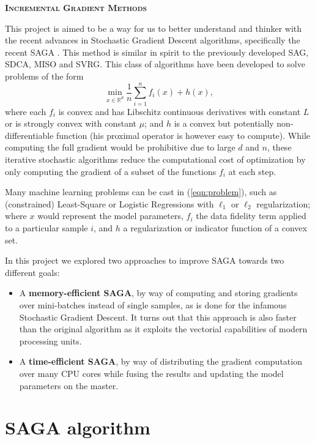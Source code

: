\documentclass[a4paper,11pt]{article}
\newcommand{\R}{\mathbb{R}}
\newcommand{\eqnref}[1]{(\ref{eqn:#1})}
\begin{document}
\begin{center}
	\Large{\textbf{\textsc{Incremental Gradient Methods}}}
\end{center}

This project is aimed to be a way for us to better understand and thinker with
the recent advances in Stochastic Gradient Descent algorithms, specifically
the recent SAGA \cite{defazio_saga_2014}. This method is similar in spirit to
the previously developed SAG, SDCA, MISO and SVRG. This class of algorithms have
been developed to solve problems of the form
\begin{equation} \label{eqn:problem}
	\min_{x \in \R^d} \frac{1}{n} \sum_{i=1}^n f_i(x) + h(x),
\end{equation}
where each $f_i$ is convex and has Libschitz continuous derivatives with
constant $L$ or is strongly convex with constant $\mu$; and $h$ is a convex but
potentially non-differentiable function (his proximal operator is however easy
to compute). While computing the full gradient would be prohibitive due to large
$d$ and $n$, these iterative stochastic algorithms reduce the computational cost
of optimization by only computing the gradient of a subset of the functions
$f_i$ at each step.

Many machine learning problems can be cast in \eqnref{problem}, such as
(constrained) Least-Square or Logistic Regressions with $\ell_1$ or $\ell_2$
regularization; where $x$ would represent the model parameters, $f_i$ the data
fidelity term applied to a particular sample $i$, and $h$ a regularization or
indicator function of a convex set.

In this project we explored two approaches to improve SAGA towards two different
goals:
\begin{itemize}
	\item A \textbf{memory-efficient SAGA}, by way of computing and storing
		gradients over mini-batches instead of single samples, as is done for
		the infamous Stochastic Gradient Descent. It turns out that this
		approach is also faster than the original algorithm as it exploits the
		vectorial capabilities of modern processing units.
	\item A \textbf{time-efficient SAGA}, by way of distributing the gradient
		computation over many CPU cores while fusing the results and updating
		the model parameters on the master.
\end{itemize}

\section{SAGA algorithm} \label{sec1}
\end{document}
